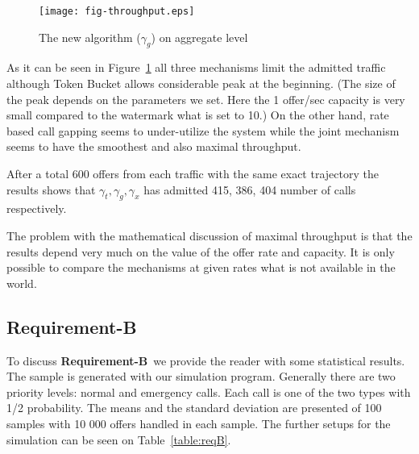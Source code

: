\documentclass[conference]{IEEEtran}
\newcommand{\reqB}{\textbf{Requirement-B}}
\begin{document}
\begin{figure}[h]
\begin{center}
\texttt{[image: fig-throughput.eps]}
\end{center}
\caption{The new algorithm ($\gamma_g$) on aggregate
level}\label{fig:throughput}
\end{figure}

As it can be seen in Figure~\ref{fig:throughput} all three
mechanisms limit the admitted traffic although Token Bucket allows
considerable peak at the beginning. (The size of the peak depends on
the parameters we set. Here the 1 offer/sec capacity is very small
compared to the watermark what is set to 10.) On the other hand,
rate based call gapping seems to under-utilize the system while the
joint mechanism seems to have the smoothest and also maximal
throughput.

After a total 600 offers from each traffic with the same exact
trajectory the results shows that $\gamma_t,\gamma_g,\gamma_x$ has
admitted 415, 386, 404 number of calls respectively.

The problem with the mathematical discussion of maximal throughput
is that the results depend very much on the value of the offer rate
and capacity. It is only possible to compare the mechanisms at given
rates what is not available in the world.

\subsection{\reqB\ }
To discuss \reqB\ we provide the reader with some statistical
results. The sample is generated with our simulation program.
Generally there are two priority levels: normal and emergency calls.
Each call is one of the two types with 1/2 probability. The means
and the standard deviation are presented of 100 samples with 10 000
offers handled in each sample. The further setups for the simulation
can be seen on Table~\ref{table:reqB}.
\end{document}
